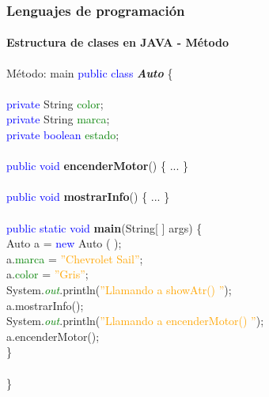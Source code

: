 \documentclass{beamer}
\begin{document}
		\begin{frame}
			\frametitle{Lenguajes de programaci\'on}
			\framesubtitle{Estructura de clases en JAVA - M\'etodo}

			\begin{block}{M\'etodo: main}
				{\tiny
				\textcolor{blue}{public class} \textbf{\emph{Auto}} \{ \\
				\hspace{1cm} \\
				\hspace{1cm} \textcolor{blue}{private} String \textcolor{green}{color}; \ \\
				\hspace{1cm} \textcolor{blue}{private} String \textcolor{green}{marca}; \ \\
				\hspace{1cm} \textcolor{blue}{private} \textcolor{blue}{boolean} \textcolor{green}{estado}; \ \\
				\hspace{1cm} \\
				\hspace{1cm} \textcolor{blue}{public void} \textbf{encenderMotor}() \{ ... \} \\
				\hspace{1cm} \\
				\hspace{1cm} \textcolor{blue}{public void} \textbf{mostrarInfo}() \{ ... \} \\
				\hspace{1cm} \\
				\hspace{1cm} \textcolor{blue}{public static void} \textbf{main}(String[ ] args) \{ \\
				\hspace{2cm} Auto a = \textcolor{blue}{new} Auto ( ); \\
				\hspace{2cm} a.\textcolor{green}{marca} = \textcolor{orange}{''Chevrolet Sail''}; \\
				\hspace{2cm} a.\textcolor{green}{color} = \textcolor{orange}{''Gris''}; \\
				\hspace{2cm} System.\emph{\textcolor{green}{out}}.println(\textcolor{orange}{''Llamando a showAtr() ''}); \\
				\hspace{2cm} a.mostrarInfo(); \\
				\hspace{2cm} System.\emph{\textcolor{green}{out}}.println(\textcolor{orange}{''Llamando a encenderMotor() ''}); \\
				\hspace{2cm} a.encenderMotor(); \\
				\hspace{1cm} \} \\
				\hspace{1cm} \\
				\}}
			\end{block}
			
		\end{frame}
\end{document}
